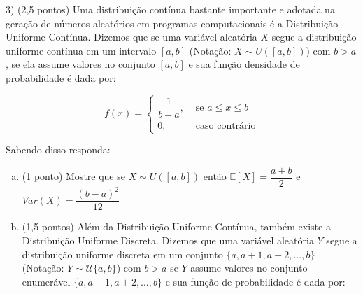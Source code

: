 \documentclass[12pt]{article}
\begin{document}
\begin{enumerate}[a)]





3) (2,5 pontos) Uma distribuição contínua bastante importante e adotada na geração de números aleatórios em programas computacionais é a Distribuição Uniforme Contínua. 
Dizemos que se uma variável aleatória $X$ segue a distribuição uniforme contínua em um intervalo $[a,b]$ (Notação: $X \sim U([a,b])$) com $b > a$, se ela assume valores
no conjunto $[a,b]$ e sua função densidade de probabilidade é dada por:

$$f(x) = \begin{cases}
\dfrac{1}{b-a}, & \text{ se } a \leq  x \leq b \\
0, & \text{ caso contrário}
\end{cases}$$

Sabendo disso responda:

\begin{enumerate}[a)]
    \item(1 ponto) Mostre que se $X \sim U([a,b])$ então $\mathbb{E}[X] = \dfrac{a+b}{2}$ e $Var(X) = \dfrac{(b-a)^2}{12}$
    \item(1,5 pontos) Além da Distribuição Uniforme Contínua, também existe a Distribuição Uniforme Discreta. 
    Dizemos que uma variável aleatória $Y$ segue a distribuição uniforme discreta em um conjunto $\{a, a+1, a+2, \dots, b\}$ (Notação: $Y \sim \mathcal{U}\{a,b\}$) com $b > a$ se $Y$ assume valores no conjunto enumerável
    $\{a, a+1, a+2, \dots, b\}$ e sua função de probabilidade é dada por:


\end{enumerate}
\end{enumerate}
\end{document}
